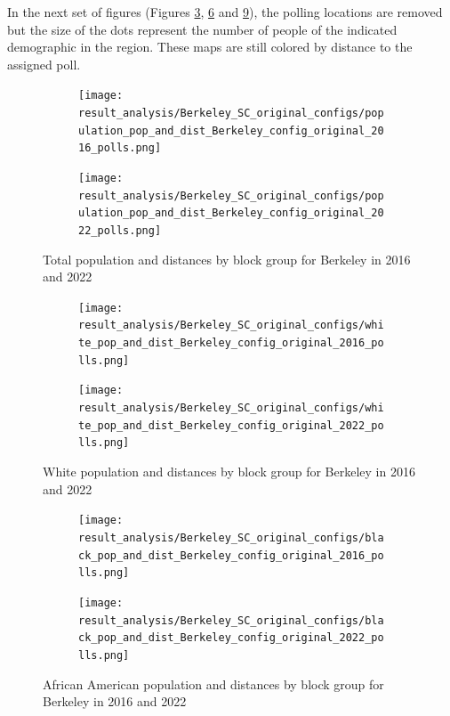 \documentclass[11pt]{article}
\theoremstyle{remark}
\theoremstyle{definition}
\begin{document}
In the next set of figures (Figures \ref{fig:Berkeley distance Total population maps}, \ref{fig:Berkeley distance White population maps} and \ref{fig:Berkeley distance Black population maps}), the polling locations are removed but the size of the dots represent the number of people of the indicated demographic in the region. These maps are still colored by distance to the assigned poll.

\begin{figure}
	\begin{subfigure}{.5\textwidth}
		\centering
		\texttt{[image: result\_analysis/Berkeley\_SC\_original\_configs/population\_pop\_and\_dist\_Berkeley\_config\_original\_2016\_polls.png]}
		\label{sfig:York_2016_bg_dist_pop}
	\end{subfigure} 
	\begin{subfigure}{.5\textwidth}
		\centering
		\texttt{[image: result\_analysis/Berkeley\_SC\_original\_configs/population\_pop\_and\_dist\_Berkeley\_config\_original\_2022\_polls.png]}
		\label{sfig:Berkeley_2022_bg_dist}
	\end{subfigure}
	\caption{Total population and distances by block group for Berkeley in 2016 and 2022}
	\label{fig:Berkeley distance Total population maps}
\end{figure}

\begin{figure}
	\begin{subfigure}{.5\textwidth}
		\centering
		\texttt{[image: result\_analysis/Berkeley\_SC\_original\_configs/white\_pop\_and\_dist\_Berkeley\_config\_original\_2016\_polls.png]}
		\label{sfig:York_2016_bg_dist_pop}
	\end{subfigure} 
	\begin{subfigure}{.5\textwidth}
		\centering
		\texttt{[image: result\_analysis/Berkeley\_SC\_original\_configs/white\_pop\_and\_dist\_Berkeley\_config\_original\_2022\_polls.png]}
		\label{sfig:Berkeley_2022_bg_dist}
	\end{subfigure}
	\caption{White population and distances by block group for Berkeley in 2016 and 2022}
	\label{fig:Berkeley distance White population maps}
\end{figure}

\begin{figure}
	\begin{subfigure}{.5\textwidth}
		\centering
		\texttt{[image: result\_analysis/Berkeley\_SC\_original\_configs/black\_pop\_and\_dist\_Berkeley\_config\_original\_2016\_polls.png]}
		\label{sfig:York_2016_bg_dist_pop}
	\end{subfigure} 
	\begin{subfigure}{.5\textwidth}
		\centering
		\texttt{[image: result\_analysis/Berkeley\_SC\_original\_configs/black\_pop\_and\_dist\_Berkeley\_config\_original\_2022\_polls.png]}
		\label{sfig:Berkeley_2022_bg_dist}
	\end{subfigure}
	\caption{African American population and distances by block group for Berkeley in 2016 and 2022}
	\label{fig:Berkeley distance Black population maps}
\end{figure}
\end{document}
